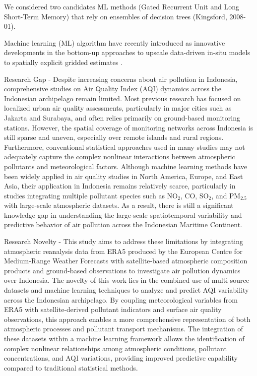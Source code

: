 \documentclass[review,12pt]{elsarticle}
\begin{document}
We considered two candidates ML methods (Gated Recurrent Unit and Long Short-Term Memory) that rely on ensembles of decision trees (Kingsford, 2008-01). 

Machine learning (ML) algorithm have recently introduced as innovative developments in the bottom-up approaches to upscale data-driven in-situ models to spatially explicit gridded estimates \cite{Son2023}.

Research Gap - Despite increasing concerns about air pollution in Indonesia, comprehensive studies on Air Quality Index (AQI) dynamics across the Indonesian archipelago remain limited. Most previous research has focused on localized urban air quality assessments, particularly in major cities such as Jakarta and Surabaya, and often relies primarily on ground-based monitoring stations. However, the spatial coverage of monitoring networks across Indonesia is still sparse and uneven, especially over remote islands and rural regions. Furthermore, conventional statistical approaches used in many studies may not adequately capture the complex nonlinear interactions between atmospheric pollutants and meteorological factors. Although machine learning methods have been widely applied in air quality studies in North America, Europe, and East Asia, their application in Indonesia remains relatively scarce, particularly in studies integrating multiple pollutant species such as NO$_2$, CO, SO$_2$, and PM$_{2.5}$ with large-scale atmospheric datasets. As a result, there is still a significant knowledge gap in understanding the large-scale spatiotemporal variability and predictive behavior of air pollution across the Indonesian Maritime Continent.

Research Novelty - This study aims to address these limitations by integrating atmospheric reanalysis data from ERA5 produced by the European Centre for Medium-Range Weather Forecasts with satellite-based atmospheric composition products and ground-based observations to investigate air pollution dynamics over Indonesia. The novelty of this work lies in the combined use of multi-source datasets and machine learning techniques to analyze and predict AQI variability across the Indonesian archipelago. By coupling meteorological variables from ERA5 with satellite-derived pollutant indicators and surface air quality observations, this approach enables a more comprehensive representation of both atmospheric processes and pollutant transport mechanisms. The integration of these datasets within a machine learning framework allows the identification of complex nonlinear relationships among atmospheric conditions, pollutant concentrations, and AQI variations, providing improved predictive capability compared to traditional statistical methods.
\end{document}
